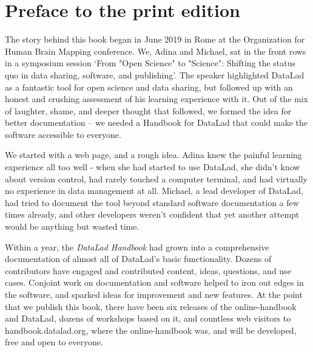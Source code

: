 \chapter*{Preface to the print edition}

The story behind this book began in June 2019 in Rome at the Organization for
Human Brain Mapping conference. We, Adina and Michael, sat in the front rows in
a symposium session ‘From "Open Science" to "Science": Shifting the status quo
in data sharing, software, and publishing’. The speaker highlighted DataLad as
a fantastic tool for open science and data sharing, but followed up with an
honest and crushing assessment of his learning experience with it. Out of the
mix of laughter, shame, and deeper thought that followed, we formed the idea
for better documentation -- we needed a Handbook for DataLad that could make the
software accessible to everyone.

We started with a web page, and a rough idea. Adina knew the painful learning
experience all too well - when she had started to use DataLad, she didn’t know
about version control, had rarely touched a computer terminal, and had virtually no
experience in data management at all. Michael, a lead developer of DataLad, had
tried to document the tool beyond standard software documentation a few times
already, and other developers weren’t confident that yet another attempt would
be anything but wasted time.

Within a year, the \textit{DataLad Handbook} had grown into a comprehensive
documentation of almost all of DataLad’s basic functionality. Dozens of
contributors have engaged and contributed content, ideas, questions, and use
cases. Conjoint work on documentation and software helped to iron out edges in
the software, and sparked ideas for improvement and new features. At the point
that we publish this book, there have been six releases of the
online-handbook and DataLad, dozens of workshops based on it, and countless web
visitors to handbook.datalad.org, where the online-handbook was, and will be
developed, free and open to everyone.

